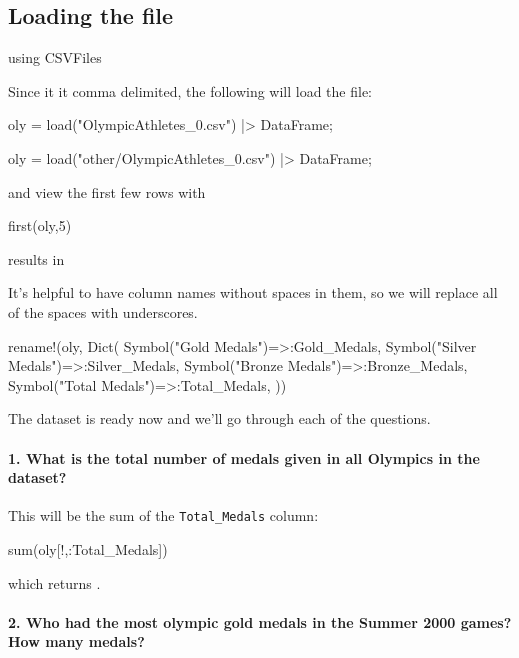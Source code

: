 \subsection{Loading the file}
\begin{jlcode}[data]
using CSVFiles
\end{jlcode}
%
Since it it comma delimited, the following will load the file:
%
\begin{jlverbatim}
oly = load("OlympicAthletes_0.csv") |> DataFrame;
\end{jlverbatim}
\begin{jlcode}[data]
oly = load("other/OlympicAthletes_0.csv") |> DataFrame;
\end{jlcode}

%
and view the first few rows with
%
\begin{jlblock}[data]
first(oly,5)
\end{jlblock}
results in  \printpythontex[verbatim][breakanywhere=true]

It's helpful to have column names without spaces in them, so we will
replace all of the spaces with underscores.
%
\begin{jlblock}[data]
rename!(oly, Dict(
    Symbol("Gold Medals")=>:Gold_Medals,
    Symbol("Silver Medals")=>:Silver_Medals,
    Symbol("Bronze Medals")=>:Bronze_Medals,
    Symbol("Total Medals")=>:Total_Medals,
    ))
\end{jlblock}

The dataset is ready now and we'll go through each of the questions. 

\paragraph{1. What is the total number of medals given in all Olympics in the dataset?}

This will be the sum of the \texttt{Total\_Medals} column:

\begin{jlblock}[data]
sum(oly[!,:Total_Medals])
\end{jlblock}

which returns  \printpythontex[verb].

\paragraph{2. Who had the most olympic gold medals in the Summer 2000 games? How many medals?}

